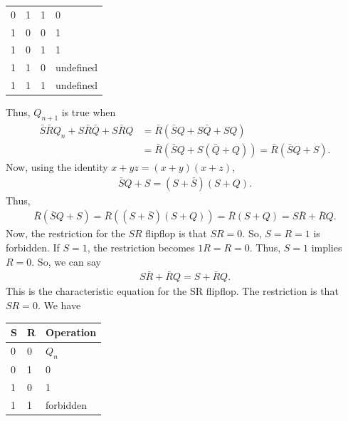 \documentclass{report}
\begin{document}
\begin{itemize}
\begin{center}
\begin{tabularx}{\textwidth}{@{}XXXX@{}}
                    0 & 1 & 1& 0\\[2ex]
                    1 & 0 & 0& 1\\[2ex]
                    1 & 0 & 1& 1\\[2ex]
                    1 & 1 & 0& undefined\\[2ex]
                    1 & 1 & 1& undefined \\
                    \bottomrule
                \end{tabularx}
            \end{center}
            Thus, $Q_{n+1}$ is true when
            \begin{align*}
                \bar{S}\bar{R}Q_{n} + S\bar{R}\bar{Q} + S\bar{R}Q &= \bar{R}(\bar{S}Q + S\bar{Q} + SQ) \\
                &=\bar{R}(\bar{S}Q + S(\bar{Q} + Q)) = \bar{R}(\bar{S}Q  + S)
            .\end{align*}
            Now, using the identity $x + yz = (x+y)(x+z)$,
            \begin{align*}
                \bar{S}Q + S = (S+\bar{S})(S+Q)
            .\end{align*}
            Thus,
            \begin{align*}
                \bar{R}(\bar{S}Q  + S) = \bar{R}((S+\bar{S})(S+Q)) = \bar{R}(S+Q) = S\bar{R} + \bar{R}Q
            .\end{align*}
            Now, the restriction for the $SR$ flipflop is that $SR = 0$. So, $S = R = 1$ is forbidden. If $S = 1$, the restriction becomes $1R  = R = 0$. Thus, $S = 1$ implies $R = 0$. So, we can say
            \begin{align*}
                S\bar{R} + \bar{R}Q = S + \bar{R}Q
            .\end{align*}
            This is the characteristic equation for the SR flipflop. The restriction is that $SR = 0$. We have
            \bigbreak \noindent 
            \begin{center}
                \begin{tabularx}{\textwidth}{@{}XXX@{}}
                    \toprule
                    \textbf{S} & \textbf{R}  & \textbf{Operation} \\
                    \midrule
                    0 & 0 & $Q_{n}$\\[2ex]
                    0 & 1 & 0\\[2ex]
                    1 & 0 & 1 \\[2ex]
                    1 & 1 & forbidden \\

\end{tabularx}
\end{center}
\end{itemize}
\end{document}
